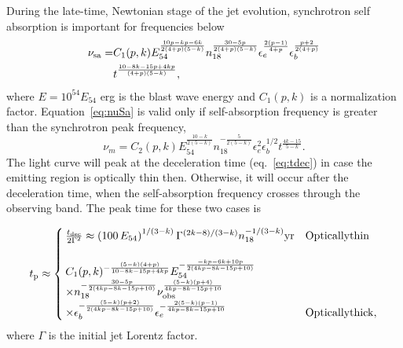 \documentclass[usenatbib,fleqn]{mnras}
\begin{document}
During the late-time, Newtonian stage of the jet evolution,
synchrotron self absorption is important for frequencies below
\begin{align}
  \nu_{\rm sa}=&C_1(p, k) E_{54}^{\frac{10 p-k p -6 k}{2 (4+p) (5-k)}} n_{18}^{\frac{30 - 5 p}{2 (4 + p) (5 - k)}}
  \epsilon_e^{\frac{2 (p-1)}{4+p}} \epsilon_b^{\frac{p+2}{2 (4+p)}}\nonumber\\
  &t^{\frac{10 - 8 k - 15 p + 4 k p}{(4 + p) (5 - k)}}, 
\label{eq:nuSa} 
\end{align}
%
where $E = 10^{54}E_{54}$ erg is the blast wave energy and $C_1(p, k)$
is a normalization factor.  Equation~\eqref{eq:nuSa} is valid only if
self-absorption frequency is greater than the synchrotron peak
frequency,
\begin{equation}
\nu_m=C_2(p, k) E_{54}^{\frac{10-k}{2 (5-k)}} n_{18}^{-\frac{5}{2
    (5-k)}}  \epsilon_e^2  \epsilon_b^{1/2}  t^{\frac{4 k-15}{5-k}}.
\label{eq:num}
\end{equation}
%
The light curve will peak at the deceleration time (eq.~\ref{eq:tdec})
in case the emitting region is optically thin then. Otherwise, it will
occur after the deceleration time, when the self-absorption frequency
crosses through the observing band. The peak time for these two cases
is

\begin{align}
t_{\rm p} \approx
\begin{cases}
  \frac{t_{\rm dec}}{2 \Gamma^2} \approx \left(100 \,
    E_{54}\right)^{1/(3-k)}  \Gamma^{(2k - 8)/(3-k)}
  n_{18}^{-1/(3-k)} {\rm yr} & {\rm Optically thin}\\\\
  C_1(p, k)^{-\frac{(5 - k) (4 + p)}{10 - 8 k - 15 p + 4 k
      p}}E_{54}^{-\frac{-k p-6 k+10 p}{2 (4 k p-8 k-15 p+10)}}\\
  \times n_{18}^{-\frac{30-5 p}{2 (4 k p-8 k-15 p+10)}} \nu_{\rm
    obs}^{\frac{(5-k) (p+4)}{4 k p-8 k-15 p+10}}\\
  \times \epsilon_b^{-\frac{(5-k) (p+2)}{2 (4 k p-8 k-15 p+10)}}
  \epsilon_e^{-\frac{2 (5-k) (p-1)}{4 k p-8 k-15 p+10}} & {\rm
    Optically thick},
\end{cases}
\label{eq:tpeakGen}
\end{align}
%
where $\Gamma$ is the initial jet Lorentz factor. 
\end{document}
